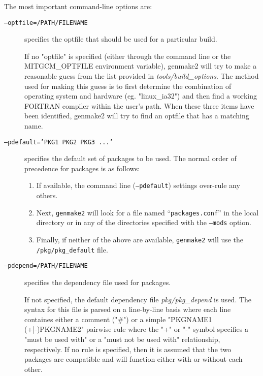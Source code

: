 The most important command-line options are:
\begin{description}
  
\item[\texttt{--optfile=/PATH/FILENAME}] specifies the optfile that
  should be used for a particular build.
  
  If no "optfile" is specified (either through the command line or the
  MITGCM\_OPTFILE environment variable), genmake2 will try to make a
  reasonable guess from the list provided in {\em
    tools/build\_options}.  The method used for making this guess is
  to first determine the combination of operating system and hardware
  (eg. "linux\_ia32") and then find a working FORTRAN compiler within
  the user's path.  When these three items have been identified,
  genmake2 will try to find an optfile that has a matching name.
  
\item[\texttt{--pdefault='PKG1 PKG2 PKG3 ...'}] specifies the default
  set of packages to be used.  The normal order of precedence for
  packages is as follows:
  \begin{enumerate}
  \item If available, the command line (\texttt{--pdefault}) settings
    over-rule any others.

  \item Next, \texttt{genmake2} will look for a file named
    ``\texttt{packages.conf}'' in the local directory or in any of the
    directories specified with the \texttt{--mods} option.
    
  \item Finally, if neither of the above are available,
    \texttt{genmake2} will use the \texttt{/pkg/pkg\_default} file.
  \end{enumerate}
  
\item[\texttt{--pdepend=/PATH/FILENAME}] specifies the dependency file
  used for packages.
  
  If not specified, the default dependency file {\em pkg/pkg\_depend}
  is used.  The syntax for this file is parsed on a line-by-line basis
  where each line containes either a comment ("\#") or a simple
  "PKGNAME1 (+|-)PKGNAME2" pairwise rule where the "+" or "-" symbol
  specifies a "must be used with" or a "must not be used with"
  relationship, respectively.  If no rule is specified, then it is
  assumed that the two packages are compatible and will function
  either with or without each other.
  

\end{description}
